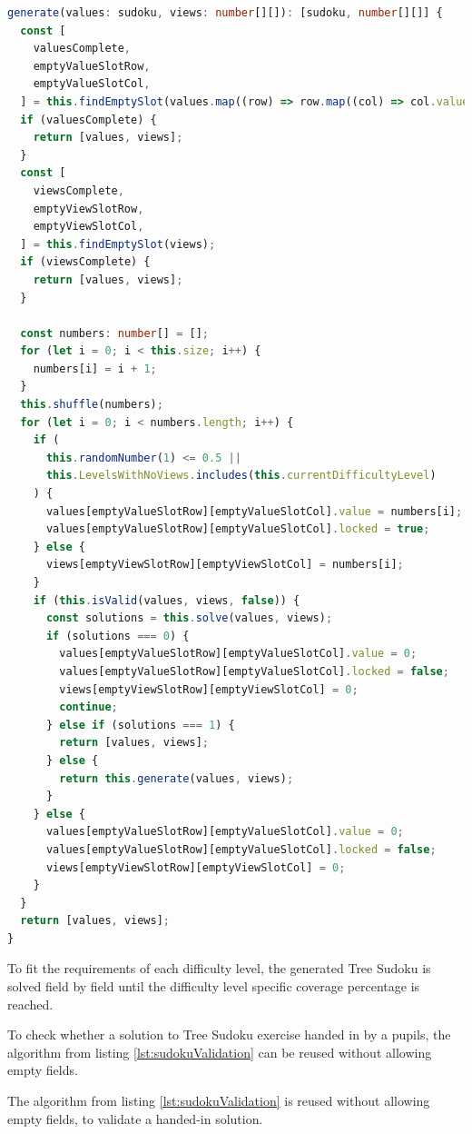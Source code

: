 \begin{lstlisting}[language=TypeScript,caption={Generation algorithm for a Tree Sudoku instance},label={lst:sudokuGenerator}]
generate(values: sudoku, views: number[][]): [sudoku, number[][]] {
  const [
    valuesComplete,
    emptyValueSlotRow,
    emptyValueSlotCol,
  ] = this.findEmptySlot(values.map((row) => row.map((col) => col.value)));
  if (valuesComplete) {
    return [values, views];
  }
  const [
    viewsComplete,
    emptyViewSlotRow,
    emptyViewSlotCol,
  ] = this.findEmptySlot(views);
  if (viewsComplete) {
    return [values, views];
  }

  const numbers: number[] = [];
  for (let i = 0; i < this.size; i++) {
    numbers[i] = i + 1;
  }
  this.shuffle(numbers);
  for (let i = 0; i < numbers.length; i++) {
    if (
      this.randomNumber(1) <= 0.5 ||
      this.LevelsWithNoViews.includes(this.currentDifficultyLevel)
    ) {
      values[emptyValueSlotRow][emptyValueSlotCol].value = numbers[i];
      values[emptyValueSlotRow][emptyValueSlotCol].locked = true;
    } else {
      views[emptyViewSlotRow][emptyViewSlotCol] = numbers[i];
    }
    if (this.isValid(values, views, false)) {
      const solutions = this.solve(values, views);
      if (solutions === 0) {
        values[emptyValueSlotRow][emptyValueSlotCol].value = 0;
        values[emptyValueSlotRow][emptyValueSlotCol].locked = false;
        views[emptyViewSlotRow][emptyViewSlotCol] = 0;
        continue;
      } else if (solutions === 1) {
        return [values, views];
      } else {
        return this.generate(values, views);
      }
    } else {
      values[emptyValueSlotRow][emptyValueSlotCol].value = 0;
      values[emptyValueSlotRow][emptyValueSlotCol].locked = false;
      views[emptyViewSlotRow][emptyViewSlotCol] = 0;
    }
  }
  return [values, views];
}
\end{lstlisting}

To fit the requirements of each difficulty level, the generated Tree Sudoku is solved field by field until the difficulty level specific coverage percentage is reached.

To check whether a solution to Tree Sudoku exercise handed in by a pupils, the algorithm from listing \ref{lst:sudokuValidation} can be reused without allowing empty fields.

The algorithm from listing \ref{lst:sudokuValidation} is reused without allowing empty fields, to validate a handed-in solution.
